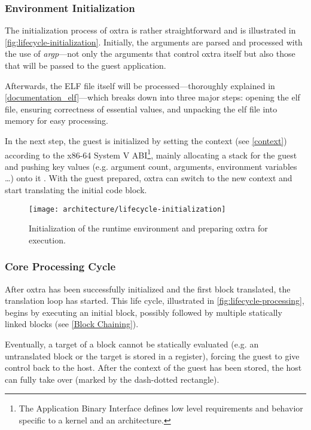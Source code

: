 	\subsubsection{Environment Initialization}
		The initialization process of oxtra is rather straightforward and is illustrated in \autoref{fig:lifecycle-initialization}. Initially, the arguments are parsed and processed with the use of \emph{argp}---not only the arguments that control oxtra itself but also those that will be passed to the guest application.
		
		Afterwards, the ELF file itself will be processed---thoroughly explained in \ref{documentation_elf}---which breaks down into three major steps: opening the elf file, ensuring correctness of essential values, and unpacking the elf file into memory for easy processing.
		
		In the next step, the guest is initialized by setting the context (see \ref{context}) according to the x86-64 System V ABI\footnote{The Application Binary Interface defines low level requirements and behavior specific to a kernel and an architecture.}, mainly allocating a stack for the guest and pushing key values (e.g. argument count, arguments, environment variables \dots) onto it \cite{systemv}. With the guest prepared, oxtra can switch to the new context and start translating the initial code block.
		
		\begin{figure}[htb]
			\centering
			\texttt{[image: architecture/lifecycle-initialization]}
			\caption[Runtime Initialization]{Initialization of the runtime environment and preparing oxtra for execution.}
			\label{fig:lifecycle-initialization}
		\end{figure}
	
	\subsubsection{Core Processing Cycle}
		After oxtra has been successfully initialized and the first block translated, the translation loop has started. This life cycle, illustrated in \autoref{fig:lifecycle-processing}, begins by executing an initial block, possibly followed by multiple statically linked blocks (see \ref{Block Chaining}).
		
		Eventually, a target of a block cannot be statically evaluated (e.g. an untranslated block or the target is stored in a register), forcing the guest to give control back to the host. After the context of the guest has been stored, the host can fully take over (marked by the dash-dotted rectangle).
		
